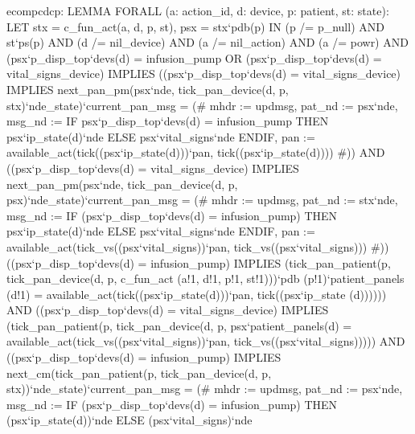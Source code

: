 ecompcdcp: LEMMA
FORALL (a: action_id, d: device, p: patient, st: state):
LET stx = c_fun_act(a, d, p, st), psx = stx`pdb(p) IN
    (p /= p_null) AND st`ps(p) AND (d /= nil_device) AND
     (a /= nil_action) AND (a /= powr) AND
     (psx`p_disp_top`devs(d) = infusion_pump OR
     (psx`p_disp_top`devs(d) = vital_signs_device)
IMPLIES
((psx`p_disp_top`devs(d) = vital_signs_device) IMPLIES
  next_pan_pm(psx`nde,
      tick_pan_device(d, p, stx)`nde_state)`current_pan_msg
         =
         (# mhdr := updmsg,
            pat_nd := psx`nde,
            msg_nd
              := IF psx`p_disp_top`devs(d) = infusion_pump
                   THEN psx`ip_state(d)`nde
                 ELSE psx`vital_signs`nde
                 ENDIF,
            pan
              := available_act(tick((psx`ip_state(d)))`pan,
                               tick((psx`ip_state(d)))) #)) AND
   ((psx`p_disp_top`devs(d) = vital_signs_device)
        IMPLIES
        next_pan_pm(psx`nde,
               tick_pan_device(d, p, psx)`nde_state)`current_pan_msg
         =
         (# mhdr := updmsg,
            pat_nd := stx`nde,
            msg_nd
              := IF (psx`p_disp_top`devs(d) = infusion_pump)
                   THEN psx`ip_state(d)`nde
                 ELSE psx`vital_signs`nde
                 ENDIF,
            pan
              := available_act(tick_vs((psx`vital_signs))`pan,
                               tick_vs((psx`vital_signs))) #))
 ((psx`p_disp_top`devs(d) = infusion_pump)
        IMPLIES
        (tick_pan_patient(p,
                          tick_pan_device(d,
                                          p,
                                          c_fun_act
                                          (a!1, d!1, p!1, st!1)))`pdb
             (p!1)`patient_panels
             (d!1)
          =
          available_act(tick((psx`ip_state(d)))`pan,
                        tick((psx`ip_state
                                  (d)))))) AND
   ((psx`p_disp_top`devs(d) = vital_signs_device)
        IMPLIES
        (tick_pan_patient(p,
               tick_pan_device(d, p, psx`patient_panels(d)
          =
          available_act(tick_vs((psx`vital_signs))`pan,
                        tick_vs((psx`vital_signs))))) AND
((psx`p_disp_top`devs(d) = infusion_pump)
        IMPLIES
        next_cm(tick_pan_patient(p,
                  tick_pan_device(d, p, stx))`nde_state)`current_pan_msg
         =
         (# mhdr := updmsg,
            pat_nd := psx`nde,
            msg_nd
              := IF (psx`p_disp_top`devs(d) = infusion_pump)
                   THEN (psx`ip_state(d))`nde
                 ELSE (psx`vital_signs)`nde
